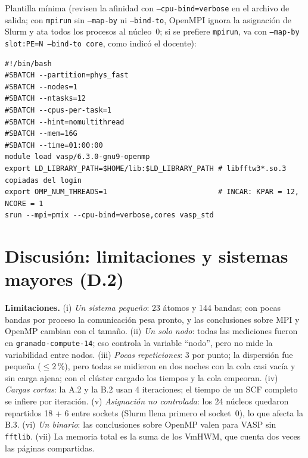 \documentclass[11pt,a4paper]{article}
\newcommand{\cod}[1]{\texttt{#1}}
\begin{document}
\noindent Plantilla mínima (revisen la afinidad con \cod{--cpu-bind=verbose} en el archivo de salida; con
\cod{mpirun} sin \cod{--map-by} ni \cod{--bind-to}, OpenMPI ignora la asignación de Slurm y ata todos los
procesos al núcleo~0; si se prefiere \cod{mpirun}, va con \cod{--map-by slot:PE=N --bind-to core}, como
indicó el docente):
{\small
\begin{verbatim}
#!/bin/bash
#SBATCH --partition=phys_fast
#SBATCH --nodes=1
#SBATCH --ntasks=12
#SBATCH --cpus-per-task=1
#SBATCH --hint=nomultithread
#SBATCH --mem=16G
#SBATCH --time=01:00:00
module load vasp/6.3.0-gnu9-openmp
export LD_LIBRARY_PATH=$HOME/lib:$LD_LIBRARY_PATH # libfftw3*.so.3 copiadas del login
export OMP_NUM_THREADS=1                          # INCAR: KPAR = 12, NCORE = 1
srun --mpi=pmix --cpu-bind=verbose,cores vasp_std
\end{verbatim}}

\section{Discusión: limitaciones y sistemas mayores (D.2)}\label{sec:d2}

\textbf{Limitaciones.} (i) \emph{Un sistema pequeño}: 23 átomos y 144 bandas; con pocas bandas por proceso
la comunicación pesa pronto, y las conclusiones sobre MPI y OpenMP cambian con el tamaño. (ii) \emph{Un solo
nodo}: todas las mediciones fueron en \cod{granado-compute-14}; eso controla la variable ``nodo'', pero no mide
la variabilidad entre nodos. (iii) \emph{Pocas repeticiones}: 3 por punto; la dispersión fue pequeña
(${\le}2$\,\%), pero todas se midieron en dos noches con la cola casi vacía y sin carga ajena; con el clúster
cargado los tiempos y la cola empeoran. (iv) \emph{Cargas cortas}: la A.2 y la B.2 usan 4 iteraciones; el tiempo
de un SCF completo se infiere por iteración. (v) \emph{Asignación no controlada}: los 24 núcleos quedaron
repartidos 18 + 6 entre sockets (Slurm llena primero el socket~0), lo que afecta la B.3. (vi) \emph{Un binario}:
las conclusiones sobre OpenMP valen para VASP sin \cod{fftlib}. (vii) La memoria total es la suma de los
VmHWM, que cuenta dos veces las páginas compartidas.
\end{document}
